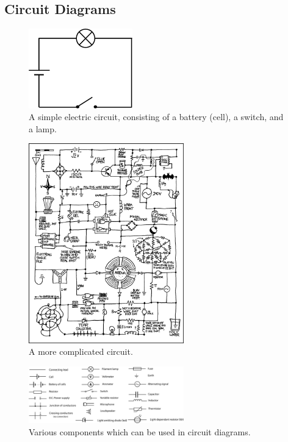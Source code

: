 \documentclass[a4paper]{amsbook}
\newcommand\capcite[1]{}
\begin{document}
\subsection{Circuit Diagrams}
\begin{figure}
  \centering
  \includegraphics[width=0.4\textwidth]{schematic}
  \caption{A simple electric circuit, consisting of a battery (cell), a switch, and a lamp. \capcite{http://www.thunderboltkids.co.za/Grade6/03-energy-and-change/images/gd-0033.png}\label{fig:schematic}}
\end{figure}
\begin{figure}
  \centering
  \includegraphics[width=0.6\textwidth]{schematic2}
  \caption{A more complicated circuit. \capcite{https://xkcd.com/730/}\label{fig:schematic2}}
\end{figure}
\begin{figure}
  \centering
  \includegraphics[width=0.6\textwidth]{circuitelements}
  \caption{Various components which can be used in circuit diagrams. \capcite{https://i.pinimg.com/originals/cb/26/ca/cb26ca8e687eeb42ec39f03b2944a98d.png}\label{fig:circuitelements}}
\end{figure}
\end{document}

